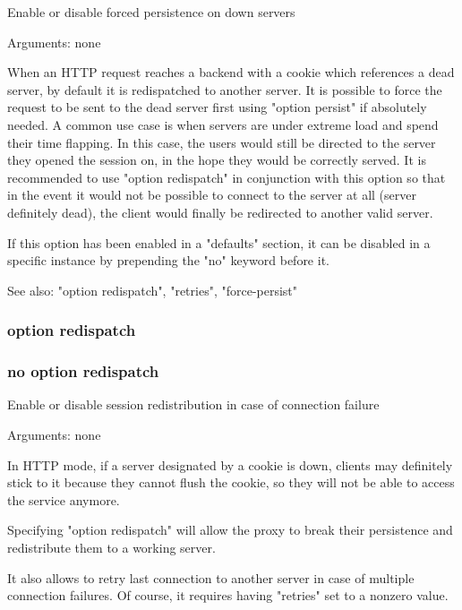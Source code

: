 
  Enable or disable forced persistence on down servers


  Arguments: none

  When an HTTP request reaches a backend with a cookie which references a dead
  server, by default it is redispatched to another server. It is possible to
  force the request to be sent to the dead server first using "option persist"
  if absolutely needed. A common use case is when servers are under extreme
  load and spend their time flapping. In this case, the users would still be
  directed to the server they opened the session on, in the hope they would be
  correctly served. It is recommended to use "option redispatch" in conjunction
  with this option so that in the event it would not be possible to connect to
  the server at all (server definitely dead), the client would finally be
  redirected to another valid server.

  If this option has been enabled in a "defaults" section, it can be disabled
  in a specific instance by prepending the "no" keyword before it.

  See also: "option redispatch", "retries", "force-persist"

\subsubsection{option redispatch}
\subsubsection{no option redispatch}


  Enable or disable session redistribution in case of connection failure


  Arguments: none

  In HTTP mode, if a server designated by a cookie is down, clients may
  definitely stick to it because they cannot flush the cookie, so they will not
  be able to access the service anymore.

  Specifying "option redispatch" will allow the proxy to break their
  persistence and redistribute them to a working server.

  It also allows to retry last connection to another server in case of multiple
  connection failures. Of course, it requires having "retries" set to a nonzero
  value.

